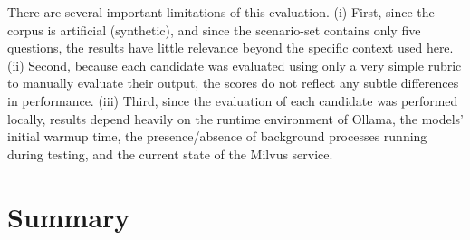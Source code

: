 There are several important limitations of this evaluation. (i) First, since the corpus is artificial (synthetic), and since the scenario-set contains only five questions, the results have little relevance beyond the specific context used here. (ii) Second, because each candidate was evaluated using only a very simple rubric to manually evaluate their output, the scores do not reflect any subtle differences in performance. (iii) Third, since the evaluation of each candidate was performed locally, results depend heavily on the runtime environment of Ollama, the models' initial warmup time, the presence/absence of background processes running during testing, and the current state of the Milvus service. 


\section{Summary}

